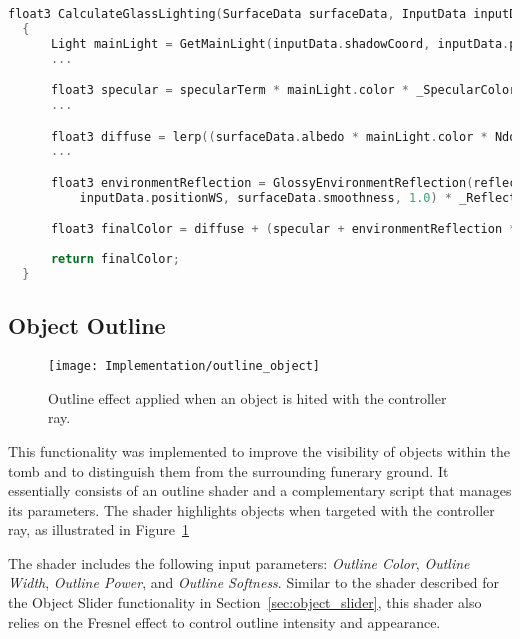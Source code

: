 \begin{lstlisting}[language=C++, caption={Lighting Glass Texture Partial Calculation.}, label={lst:lighting_glass}]
  float3 CalculateGlassLighting(SurfaceData surfaceData, InputData inputData, float fresnel)
  {
      Light mainLight = GetMainLight(inputData.shadowCoord, inputData.positionWS, inputData.shadowMask);
      ...

      float3 specular = specularTerm * mainLight.color * _SpecularColor.rgb * surfaceData.smoothness;
      ...

      float3 diffuse = lerp((surfaceData.albedo * mainLight.color * NdotL * 0.1),surfaceData.albedo, _BlendFactor);
      ...     

      float3 environmentReflection = GlossyEnvironmentReflection(reflectionVector, 
          inputData.positionWS, surfaceData.smoothness, 1.0) * _ReflectionIntensity;

      float3 finalColor = diffuse + (specular + environmentReflection * fresnel);
      
      return finalColor;
  }
\end{lstlisting}

\subsection*{Object Outline}
\label{sec:object_outline}

 \begin{figure}[h!]
    \centering
    \texttt{[image: Implementation/outline\_object]}
    \caption{Outline effect applied when an object is hited with the controller ray.}
    \label{fig:outline_object}    
\end{figure}


This functionality was implemented to improve the visibility of objects within the tomb and to distinguish them from the surrounding funerary ground.  
It essentially consists of an outline shader and a complementary script that manages its parameters. 
The shader highlights objects when targeted with the controller ray, as illustrated in Figure~\ref{fig:outline_object}

The shader includes the following input parameters: \emph{Outline Color}, \emph{Outline Width}, \emph{Outline Power}, and \emph{Outline Softness}.  
Similar to the shader described for the Object Slider functionality in Section~\ref{sec:object_slider}, this shader also relies on the Fresnel effect to control outline intensity and appearance.  

